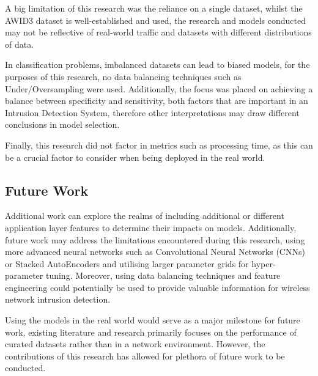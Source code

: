 A big limitation of this research was the reliance on a single dataset, whilst the AWID3 dataset is well-established and used, the research and models conducted may not be reflective of real-world traffic and datasets with different distributions of data.

In classification problems, imbalanced datasets can lead to biased models, for the purposes of this research, no data balancing techniques such as Under/Oversampling were used. Additionally, the focus was placed on achieving a balance between specificity and sensitivity, both factors that are important in an Intrusion Detection System, therefore other interpretations may draw different conclusions in model selection.

Finally, this research did not factor in metrics such as processing time, as this can be a crucial factor to consider when being deployed in the real world.

\subsection{Future Work}

Additional work can explore the realms of including additional or different application layer features to determine their impacts on models. Additionally, future work may address the limitations encountered during this research, using more advanced neural networks such as Convolutional Neural Networks (CNNs) or Stacked AutoEncoders and utilising larger parameter grids for hyper-parameter tuning. Moreover, using data balancing techniques and feature engineering could potentially be used to provide valuable information for wireless network intrusion detection. 

Using the models in the real world would serve as a major milestone for future work, existing literature and research primarily focuses on the performance of curated datasets rather than in a network environment. However, the contributions of this research has allowed for plethora of future work to be conducted.